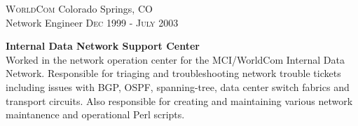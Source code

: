 
\textsc{WorldCom} \hfill Colorado Springs, CO\\
Network Engineer \hfill \textsc{Dec 1999} - \textsc{July 2003}

\textbf{Internal Data Network Support Center}\\
Worked in the network operation center for the MCI/WorldCom Internal Data
Network. Responsible for triaging and troubleshooting network trouble tickets
including issues with BGP, OSPF, spanning-tree, data center switch fabrics and
transport circuits. Also responsible for creating and maintaining various
network maintanence and operational Perl scripts.
